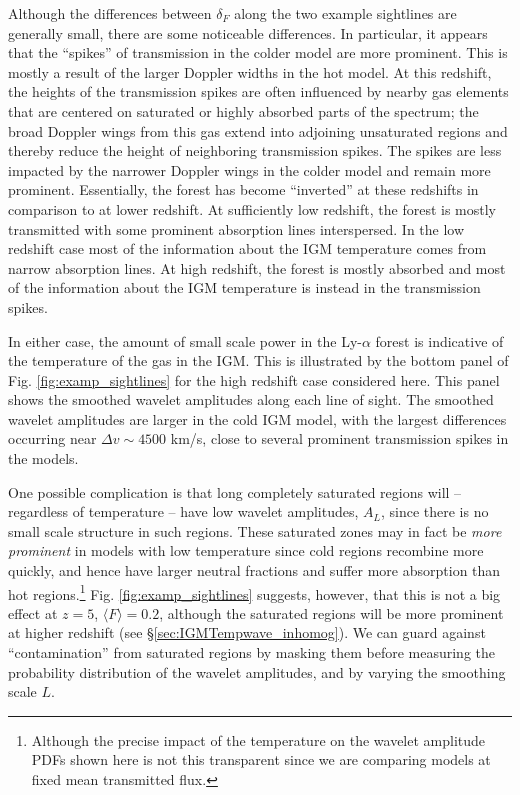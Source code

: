 Although the differences between $\delta_F$ along the
two example sightlines are generally small, there are some noticeable differences. 
In particular, it appears that the ``spikes'' of
transmission in the colder model are more prominent. This is mostly a result of the larger Doppler widths in the hot model. 
At this redshift, the heights of the transmission spikes are often influenced
by nearby gas elements that are centered on
saturated or highly absorbed parts of the spectrum; the broad Doppler wings from this gas extend into 
adjoining unsaturated regions and thereby reduce the
height of neighboring transmission spikes. The spikes are
less impacted by the narrower Doppler wings in the colder model and remain more prominent.
Essentially, the forest has become
``inverted'' at these redshifts in comparison to at lower redshift. At sufficiently low redshift, the forest is mostly transmitted
with some prominent absorption lines interspersed. In the low redshift case most of the information about the IGM temperature comes from
narrow absorption lines. At high redshift, the forest is mostly absorbed and most of the information about the IGM temperature
is instead in the transmission spikes. 

In either case, the amount of small scale power in the Ly-$\alpha$ forest is indicative
of the temperature of the gas in the IGM. This is illustrated by the bottom panel of Fig. \ref{fig:examp_sightlines} for
the high redshift case considered here. This panel
shows the smoothed wavelet amplitudes along each line of sight. The smoothed wavelet amplitudes are larger in the cold IGM model,
with the largest differences occurring near $\Delta v \sim 4500$ km/s, close to several prominent transmission spikes in the models.

One possible complication is that long completely saturated regions will -- regardless of temperature -- have low wavelet amplitudes, $A_L$, since there
is no small scale structure in such regions. These saturated zones may in fact be {\em more prominent} in models with
low temperature since cold regions recombine more quickly, and hence have larger neutral fractions and suffer more absorption 
than hot regions.\footnote{Although the precise impact of the temperature on the wavelet amplitude PDFs shown here is not this transparent since we are comparing models at fixed
mean transmitted flux.} Fig. \ref{fig:examp_sightlines} suggests, however, that this is not a big effect at $z=5$, $\langle F \rangle=0.2$, although the saturated regions will be more prominent at higher redshift (see \S \ref{sec:IGMTempwave_inhomog}). We can
guard against ``contamination'' from saturated regions by masking them before measuring the probability distribution
of the wavelet amplitudes, and by varying the smoothing scale $L$.


